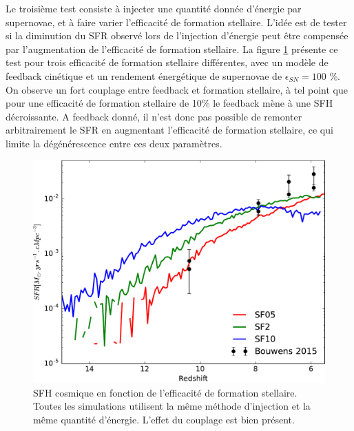 Le troisième test consiste à injecter une quantité donnée d'énergie par supernovae, et à faire varier l'efficacité de formation stellaire.
L'idée est de tester si la diminution du SFR observé lors de l'injection d'énergie peut être compensée par l'augmentation de l'efficacité de formation stellaire.
La figure \ref{fig:sfr_sfe} présente ce test pour trois efficacité de formation stellaire différentes, avec un modèle de feedback cinétique et un rendement énergétique de supernovae de $\epsilon_{SN}=100$ \%.
On observe un fort couplage entre feedback et formation stellaire, à tel point que pour une efficacité de formation stellaire de 10\% le feedback mène à une \ac{SFH} décroissante.
A feedback donné, il n'est donc pas possible de remonter arbitrairement le \ac{SFR} en augmentant l'efficacité de formation stellaire, ce qui limite la dégénérescence entre ces deux paramètres.

\begin{figure}
        \includegraphics[width=.95\textwidth]{img/03/sedov/SFR_sfeff.pdf} 
        \caption[SFH cosmique en fonction de l'efficacité de formation stellaire]{SFH cosmique en fonction de l'efficacité de formation stellaire.
        Toutes les simulations utilisent la même méthode d'injection et la même quantité d'énergie.
		L'effet du couplage est bien présent.
        }
 		\label{fig:sfr_sfe}
\end{figure}





%

